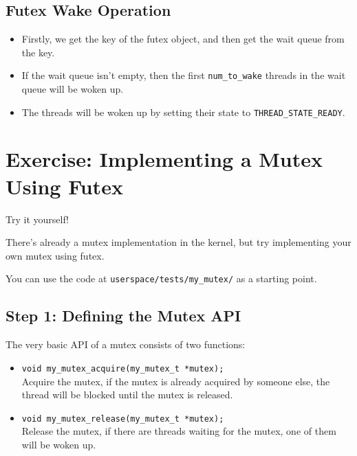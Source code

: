 \subsection{Futex Wake Operation}

\begin{itemize}
    \item Firstly, we get the key of the futex object, and then get the wait queue
          from the key.
    \item If the wait queue isn't empty, then the first \texttt{num\_to\_wake} threads
          in the wait queue will be woken up.
    \item The threads will be woken up by setting their state to \texttt{THREAD\_STATE\_READY}.
\end{itemize}

\section*{Exercise: Implementing a Mutex Using Futex}

\begin{exercise*}{Try it yourself!}
    \item There's already a mutex implementation in the kernel, but try implementing
    your own mutex using futex.
    \item You can use the code at \texttt{userspace/tests/my\_mutex/} as a starting point.
\end{exercise*}

\subsection{Step 1: Defining the Mutex API}

The very basic API of a mutex consists of two functions:

\begin{itemize}
    \item \texttt{void my\_mutex\_acquire(my\_mutex\_t *mutex);} \\
          Acquire the mutex, if the mutex is already acquired by someone else, the
          thread will be blocked until the mutex is released.
    \item \texttt{void my\_mutex\_release(my\_mutex\_t *mutex);} \\
          Release the mutex, if there are threads waiting for the mutex, one of them
          will be woken up.
\end{itemize}

